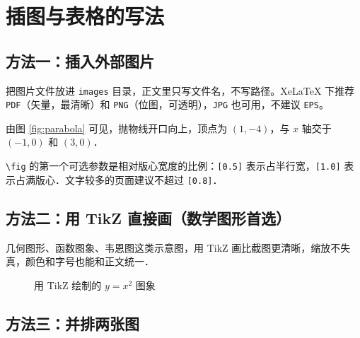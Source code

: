 
\section{插图与表格的写法}

\subsection{方法一：插入外部图片}

把图片文件放进 \texttt{images} 目录，正文里只写文件名，不写路径。XeLaTeX 下推荐 \texttt{PDF}（矢量，最清晰）和 \texttt{PNG}（位图，可透明），\texttt{JPG} 也可用，不建议 \texttt{EPS}。


由图 \ref{fig:parabola} 可见，抛物线开口向上，顶点为 $(1,-4)$，与 $x$ 轴交于 $(-1,0)$ 和 $(3,0)$．

\begin{method}[图片宽度的控制]
\texttt{\textbackslash fig} 的第一个可选参数是相对版心宽度的比例：\texttt{[0.5]} 表示占半行宽，\texttt{[1.0]} 表示占满版心．文字较多的页面建议不超过 \texttt{[0.8]}．
\end{method}

\subsection{方法二：用 TikZ 直接画（数学图形首选）}

几何图形、函数图象、韦恩图这类示意图，用 TikZ 画比截图更清晰，缩放不失真，颜色和字号也能和正文统一．

\begin{figure}[H]
  \centering
  \caption{用 TikZ 绘制的 $y=x^{2}$ 图象}
  \label{fig:tikz}
\end{figure}

\subsection{方法三：并排两张图}

